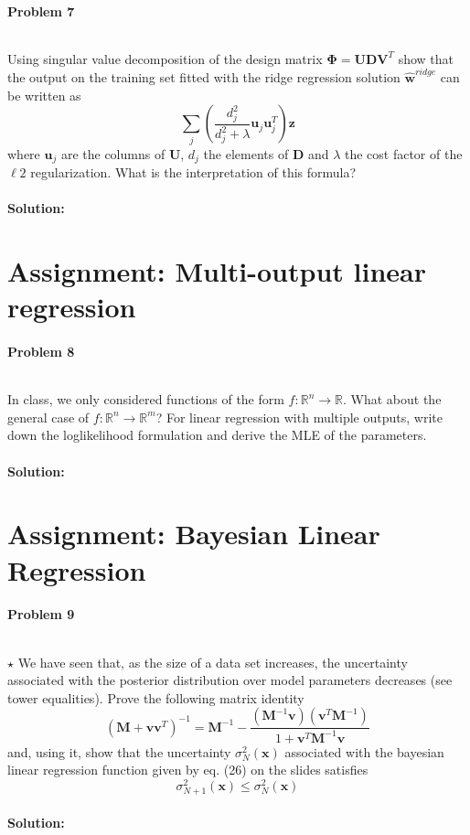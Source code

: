 \documentclass{article}
\renewcommand{\Vec}[1]{\ensuremath{\mathbf{#1}}}
\newcommand{\Mtx}[1]{\ensuremath{\mathbf{#1}}}
\newcommand{\R}{\ensuremath{\mathbb{R}}}
\begin{document}
\paragraph*{Problem 7}
$\;$ 

Using singular value decomposition of the design matrix $\Mtx{\Phi} =
\Mtx{U}\Mtx{D}\Mtx{V}^T$ show that the output on the training set fitted with
the ridge regression solution $\hat{\Vec{w}}^{ridge}$ can be written as 
\[
\sum_j \left( \frac{d_j^2}{d_j^2 + \lambda} \Vec{u}_j \Vec{u}_j^T \right) \Vec{z} 
\]
where $\Vec{u}_j$ are the columns of $\Mtx{U}$, $d_j$ the
elements of $\Mtx{D}$ and $\lambda$ the cost factor of the $\ell2$
regularization. What is the interpretation of this formula?

\paragraph*{Solution:}




\section{Assignment: Multi-output linear regression }
\paragraph*{Problem 8}
$\;$ 

In class, we only considered functions of the form $f: \R^n \rightarrow \R$. What
about the general case of $f: \R^n \rightarrow \R^m$? For linear regression with
multiple outputs, write down the loglikelihood formulation and derive the MLE of
the parameters.

\paragraph*{Solution:}





\section{Assignment: Bayesian Linear Regression }
\paragraph*{Problem 9}
$\;$ 

$\star$ 
We have seen that, as the size of a data set increases, the uncertainty
associated with the posterior distribution over model parameters decreases (see 
tower equalities). Prove the following matrix identity
\[
(\Mtx{M} + \Vec{v}\Vec{v}^T)^{-1} = \Mtx{M}^{-1} - 
\frac{(\Mtx{M}^{-1}\Vec{v})(\Vec{v}^T\Mtx{M}^{-1})}{1 + \Vec{v}^T\Mtx{M}^{-1}\Vec{v}}
\]
and, using it, show that the uncertainty $\sigma_N^2(\Vec{x})$ associated
with the bayesian linear regression function given by eq. (26) on the slides satisfies
\begin{equation}
\sigma_{N+1}^2(\Vec{x}) \leq \sigma_N^2(\Vec{x})
\label{eq:varred}
\end{equation}

\paragraph*{Solution:}
\end{document}

